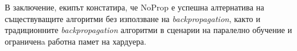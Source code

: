 \documentclass[a4paper,11pt]{article}
\begin{document}
В заключение, екипът констатира, че NoProp е успешна алтернатива на съществуващите алгоритми без използване на \emph{backpropagation}, както и традиционните \emph{backpropagation} алгоритми в сценарии на паралелно обучение и ограниченa работна памет на хардуера. 
 


\end{document}
